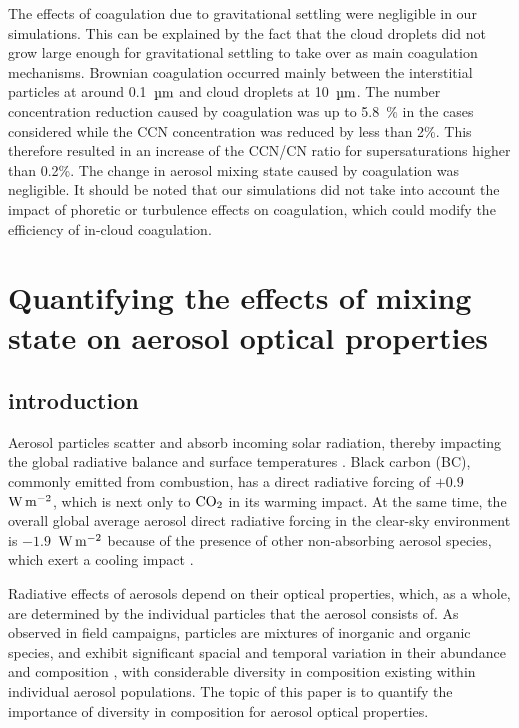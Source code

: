 \documentclass[edeposit,fullpage]{uiucthesis2009}
\makeatletter
\DeclareRobustCommand*\unit[1]
 {\ensuremath{%
   {\thinmuskip3mu\relax
    \def\mu{\text{\textmu}}\def~{\,}%
    \ifx\f@series\testbx\mathbf{#1}\else\mathrm{#1}\fi}}}
\makeatother
\begin{document}
The effects of coagulation due to gravitational settling were
negligible in our simulations. This can be explained by the fact that
the cloud droplets did not grow large enough for gravitational
settling to take over as main coagulation mechanisms. Brownian
coagulation occurred mainly between the interstitial particles at
around 0.1~$\rm \mu m$ and cloud droplets at 10~$\rm \mu m$. The
number concentration reduction caused by coagulation was up to
5.8~$\%$ in the cases considered while the CCN concentration was
reduced by less than 2\%. This therefore resulted in an increase of
the CCN/CN ratio for supersaturations higher than 0.2\%. The change in
aerosol mixing state caused by coagulation was negligible. It should
be noted that our simulations did not take into account the impact of
phoretic or turbulence effects on coagulation, which could modify the
efficiency of in-cloud coagulation.


\chapter{Quantifying the effects of mixing state on aerosol optical properties}
\label{chap4}
\section{introduction}  %
Aerosol particles scatter and absorb incoming solar radiation, thereby
impacting the global radiative balance and surface temperatures
\citep{mitchell1971effect, charlson1992climate, yu2006review,
  winker2010calipso, oikawa2013study, subba2020recent}. Black carbon
(BC), commonly emitted from combustion, has a direct radiative forcing
of $+0.9$~\unit{W\,m^{-2}}, which is next only to $\rm CO_2$
\citep{bond2013bounding, gustafsson2016convergence} in its warming
impact. At the same time, the overall global average aerosol direct
radiative forcing in the clear-sky environment is
$-1.9$~\unit{W\,m^{-2}} because of the presence of other
non-absorbing aerosol species, which exert a cooling impact
\citep{bellouin2005global}.

Radiative effects of aerosols depend on their optical properties,
which, as a whole, are determined by the individual particles that the
aerosol consists of. As observed in field campaigns, particles are
mixtures of inorganic and organic species, and exhibit significant
spacial and temporal variation in their abundance and composition
\citep{zhang2007ubiquity, bzdek2012single, LASKIN2006260}, with
considerable diversity in composition existing within individual
aerosol populations. The topic of this paper is to quantify the importance
of diversity in composition for aerosol optical properties. 
\end{document}
